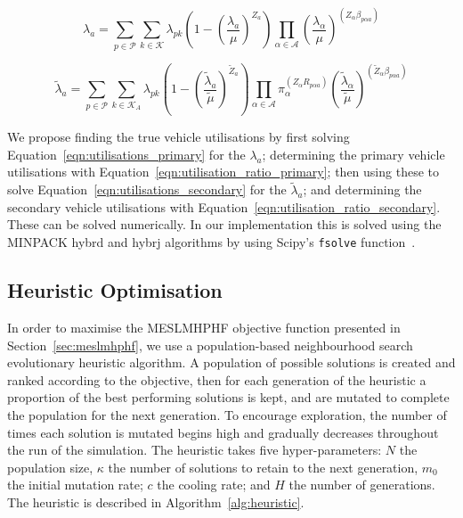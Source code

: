 \documentclass[preprint,12pt]{elsarticle}
\begin{document}
\begin{equation}\label{eqn:utilisations_primary}
\lambda_a = \sum_{p \in \mathcal{P}} \sum_{k \in \mathcal{K}} \lambda_{pk}
\left( 1 - \left(\frac{\lambda_a}{\mu}\right)^{Z_a} \right)
\prod_{\alpha \in \mathcal{A}} \left(\frac{\lambda_{\alpha}}{\mu}\right)^{
\left(Z_{\alpha} \beta_{p \alpha a}\right)}
\end{equation}

\begin{equation}\label{eqn:utilisations_secondary}
\tilde{\lambda}_a = \sum_{p \in \mathcal{P}}
\sum_{k \in \mathcal{K}_A} \lambda_{pk}
\left( 1 - \left(\frac{\tilde{\lambda}_a}{\tilde{\mu}}\right)^{\tilde{Z}_a} \right)
\prod_{\alpha \in \mathcal{A}} \pi_{\alpha}^{\left(Z_{\alpha} R_{p \alpha a}\right)}
\left(\frac{\tilde{\lambda}_{\alpha}}{\tilde{\mu}}\right)^{
\left(\tilde{Z}_{\alpha} \beta_{p \alpha a}\right)}
\end{equation}

We propose finding the true vehicle utilisations by first solving
Equation~\ref{eqn:utilisations_primary} for the $\lambda_a$; determining the
primary vehicle utilisations with Equation~\ref{eqn:utilisation_ratio_primary};
then using these to solve Equation~\ref{eqn:utilisations_secondary} for the
$\tilde{\lambda}_a$; and determining the secondary vehicle utilisations with
Equation~\ref{eqn:utilisation_ratio_secondary}. These can be solved
numerically. In our implementation this is solved using the MINPACK hybrd and
hybrj algorithms by using Scipy's \texttt{fsolve} function~\cite{2020SciPy-NMeth}.


\subsection{Heuristic Optimisation}\label{sec:heuristic}
In order to maximise the MESLMHPHF objective function presented in
Section~\ref{sec:meslmhphf}, we use a population-based neighbourhood search
evolutionary heuristic algorithm. A population of possible solutions is
created and ranked according to the objective, then for each generation of the
heuristic a proportion of the best performing solutions is kept, and are
mutated to complete the population for the next generation. To encourage
exploration, the number of times each solution is mutated begins high and
gradually decreases throughout the run of the simulation.
The heuristic takes five hyper-parameters: $N$ the population size, $\kappa$
the number of solutions to retain to the next generation, $m_0$ the initial
mutation rate; $c$ the cooling rate; and $H$ the number of generations. The
heuristic is described in Algorithm~\ref{alg:heuristic}.
\end{document}
